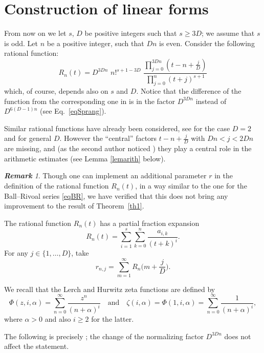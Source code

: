\documentclass{article}
\numberwithin{equation}{section}
\theoremstyle{remark}
\newtheorem{Rem}{\bf Remark}
\begin{document}
\section{Construction of linear forms} \label{sec2}

From now on we let $s$, $D$  be positive integers such that $s \geq 3D$; we assume that $s$ is odd. Let $n$ be a positive integer, such that $Dn $ is even. Consider the following rational function:
$$R_n(t) = D^{3Dn} \, \, n!^{s+1-3D} \, \, \frac{ \prod_{j=0}^{3Dn} (t-n+\frac{j}{D})}{ \prod_{j=0}^{ n} (t+j)^{s+1}}$$
which, of course, depends also on $s$ and $D$. Notice that the difference of the function from the corresponding one in \cite{Sprang} is in the factor $D^{3Dn}$ instead of $D^{6(D-1)n}$ (see Eq.~\eqref{eqSprang}).

Similar rational functions have already been considered, see \cite{Catalan} for the case $D=2$ and \cite{Nash, Nishimoto, SFcaract} for general $D$. However the ``central'' factors $t-n+\frac{j}{D}$ with $Dn < j < 2Dn$ are missing, and (as the second author noticed \cite{Sprang}) they play a central role in the arithmetic estimates (see Lemma \ref{lemarith}  below).

\bigskip

\begin{Rem} \label{Rem-r}
Though one can implement an additional parameter $r$ in the definition of the rational function $R_n(t)$,
in a way similar to the one for the Ball--Rivoal series \eqref{eqBR}, we have verified that this does not bring any
improvement to the result of Theorem~\ref{th1}.
\end{Rem}


\bigskip

The rational function $R_n(t)$ has a partial fraction expansion
\begin{equation} \label{eqelsples}
R_n(t) = \sum_{i=1}^s \sum_{k=0}^n \frac{a_{i,k}}{(t+k)^i}.
 \end{equation}
For any $j\in \{1,\ldots,D\}$, take
$$r_{n,j} = \sum_{m=1}^\infty R_n\Big(m+\frac{j}{D}\Big).$$

\bigskip

We recall that the Lerch and Hurwitz zeta functions are defined by
$$
\Phi(z,i,\alpha) = \sum_{n=0}^{\infty}\frac{z^n}{(n+\alpha)^i}
\quad\mbox{and}\quad
\zeta(i,\alpha) = \Phi(1,i,\alpha) = \sum_{n=0}^\infty \frac1{(n+\alpha)^i},
$$
where  $\alpha>0$ and also $i\geq 2$ for the latter.

\bigskip

The following is precisely \cite[Lemma~1.5]{Sprang}; the change of the normalizing factor $D^{3Dn}$ does not affect the statement.
\end{document}
